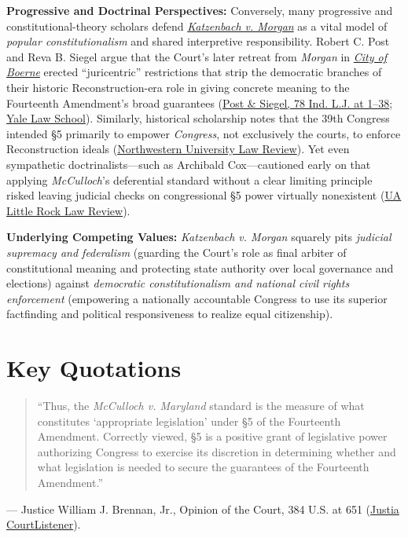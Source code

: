 \documentclass[12pt]{article}
\begin{document}
\textbf{Progressive and Doctrinal Perspectives:} Conversely, many progressive and constitutional-theory scholars defend \href{https://www.courtlistener.com/opinion/107256/katzenbach-v-morgan/}{\textit{Katzenbach v. Morgan}} as a vital model of \textit{popular constitutionalism} and shared interpretive responsibility. Robert C. Post and Reva B. Siegel argue that the Court's later retreat from \textit{Morgan} in \href{https://supreme.justia.com/cases/federal/us/521/507/}{\textit{City of Boerne}} erected ``juricentric'' restrictions that strip the democratic branches of their historic Reconstruction-era role in giving concrete meaning to the Fourteenth Amendment's broad guarantees (\href{https://law.yale.edu/sites/default/files/documents/pdf/Faculty/Siegel_ProtectingTheConstitutionFromThePeople.pdf}{Post \& Siegel, 78 Ind. L.J. at 1--38}; \href{https://law.yale.edu/sites/default/files/documents/pdf/Faculty/Siegel_PopularConstitutionalismDepartmentalismAndJudicialSupremacy.pdf}{Yale Law School}). Similarly, historical scholarship notes that the 39th Congress intended \S 5 primarily to empower \textit{Congress}, not exclusively the courts, to enforce Reconstruction ideals (\href{https://scholarlycommons.law.northwestern.edu/cgi/viewcontent.cgi?article=1349&context=nulr}{Northwestern University Law Review}). Yet even sympathetic doctrinalists---such as Archibald Cox---cautioned early on that applying \textit{McCulloch}'s deferential standard without a clear limiting principle risked leaving judicial checks on congressional \S 5 power virtually nonexistent (\href{https://research.ualr.edu/cgi/viewcontent.cgi?article=1624&context=bowen_lawreview}{UA Little Rock Law Review}).

\textbf{Underlying Competing Values:} \textit{Katzenbach v. Morgan} squarely pits \textit{judicial supremacy and federalism} (guarding the Court's role as final arbiter of constitutional meaning and protecting state authority over local governance and elections) against \textit{democratic constitutionalism and national civil rights enforcement} (empowering a nationally accountable Congress to use its superior factfinding and political responsiveness to realize equal citizenship).

\section{Key Quotations}

\begin{quote}
``Thus, the \textit{McCulloch v. Maryland} standard is the measure of what constitutes `appropriate legislation' under \S 5 of the Fourteenth Amendment. Correctly viewed, \S 5 is a positive grant of legislative power authorizing Congress to exercise its discretion in determining whether and what legislation is needed to secure the guarantees of the Fourteenth Amendment.''
\end{quote}
\noindent --- Justice William J. Brennan, Jr., Opinion of the Court, 384 U.S. at 651 (\href{https://supreme.justia.com/cases/federal/us/384/641/}{Justia} \textbar{} \href{https://www.courtlistener.com/opinion/107256/katzenbach-v-morgan/}{CourtListener}).
\end{document}
